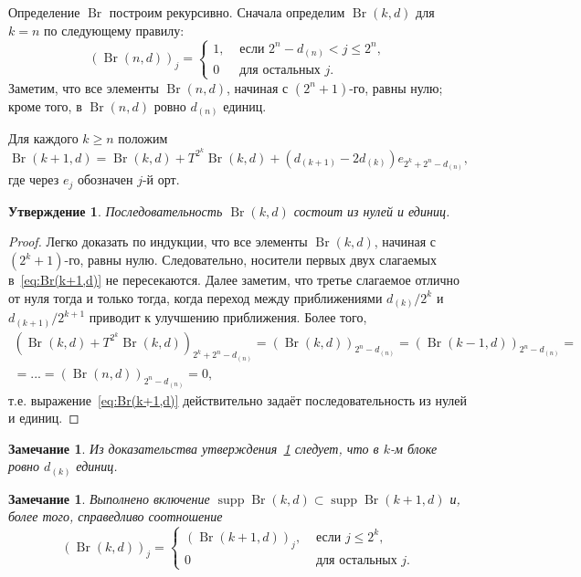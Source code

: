 \documentclass[a4paper,14pt]{article} %
\theoremstyle{plain}
\newtheorem{remark}[lemma]{Замечание}
\newtheorem{proposition}[lemma]{Утверждение}
\begin{document}
Определение $\operatorname{Br}$ построим рекурсивно.
Сначала определим $\operatorname{Br}(k,d)$ для $k=n$ по следующему правилу:
\begin{equation}
	(\operatorname{Br}(n,d))_j = \begin{cases}
		1, & \mbox{~если~} 2^n - d_{(n)} < j \leq 2^n,
		\\
		0  & \mbox{~для остальных~} j
		.
	\end{cases}
\end{equation}
Заметим, что все элементы $\operatorname{Br}(n,d)$, начиная с $(2^n+1)$-го, равны нулю;
кроме того, в $\operatorname{Br}(n,d)$ ровно $d_{(n)}$ единиц.

Для каждого $k \geq n$ положим
\begin{equation}
	\label{eq:Br(k+1,d)}
	\operatorname{Br}(k+1,d) = \operatorname{Br}(k,d) + T^{2^k}\operatorname{Br}(k,d) + (d_{(k+1)}-2d_{(k)})e_{2^k+2^n-d_{(n)}}
	,
\end{equation}
где через $e_j$ обозначен $j$-й орт.


\begin{proposition}
	\label{prop:Br_k_c_0_1}
	Последовательность $\operatorname{Br}(k,d)$ состоит из нулей и единиц.
\end{proposition}
\begin{proof}
	Легко доказать по индукции, что все элементы $\operatorname{Br}(k,d)$, начиная с $(2^k+1)$-го, равны нулю.
	Следовательно, носители первых двух слагаемых в~\eqref{eq:Br(k+1,d)} не пересекаются.
	Далее заметим, что третье слагаемое отлично от нуля тогда и только тогда,
	когда переход между приближениями $d_{(k)} / 2^k$ и $d_{(k+1)}/2^{k+1}$
	приводит к улучшению приближения.
	Более того,
	\begin{multline}
		\left(\operatorname{Br}(k,d) + T^{2^k}\operatorname{Br}(k,d)\right)_{2^k+2^n-d_{(n)}}
		=
		(\operatorname{Br}(k,d))_{2^n-d_{(n)}}
		=
		(\operatorname{Br}(k-1,d))_{2^n-d_{(n)}}
		=
		\\=
		...
		=
		(\operatorname{Br}(n,d))_{2^n-d_{(n)}}
		=
		0
		,
	\end{multline}
	т.е. выражение~\eqref{eq:Br(k+1,d)} действительно задаёт последовательность из нулей и единиц.
\end{proof}

\begin{remark}
	Из доказательства утверждения~\ref{prop:Br_k_c_0_1} следует, что в $k$-м блоке ровно $d_{(k)}$ единиц.
\end{remark}


\begin{remark}
	Выполнено включение $\operatorname{supp}\operatorname{Br}(k,d) \subset \operatorname{supp}\operatorname{Br}(k+1,d)$
	и, более того, справедливо соотношение
	\begin{equation}
		(\operatorname{Br}(k,d))_j = \begin{cases}
			(\operatorname{Br}(k+1,d))_j, & \mbox{~если~}  j \leq 2^k,
			\\
			0  & \mbox{~для остальных~} j
			.
		\end{cases}
	\end{equation}
\end{remark}
\end{document}
